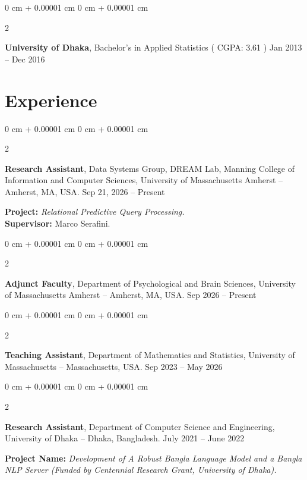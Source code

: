 \documentclass[10pt, letterpaper]{article}
\newenvironment{highlights}{
    \begin{itemize}[
        topsep=0.10 cm,
        parsep=0.10 cm,
        partopsep=0pt,
        itemsep=0pt,
        leftmargin=0 cm + 10pt
    ]
}{
    \end{itemize}
} %
\newenvironment{onecolentry}{
    \begin{adjustwidth}{
        0 cm + 0.00001 cm
    }{
        0 cm + 0.00001 cm
    }
}{
    \end{adjustwidth}
} %
\newenvironment{twocolentry}[2][]{
    \onecolentry
    \def\secondColumn{#2}
    \setcolumnwidth{\fill, 4.5 cm}
    \begin{paracol}{2}
}{
    \switchcolumn \raggedleft \secondColumn
    \end{paracol}
    \endonecolentry
} %
\begin{document}
            \vspace{0.20 cm}
    \begin{twocolentry}{
            Jan 2013 – Dec 2016
        }
            \textbf{University of Dhaka}, Bachelor's in Applied Statistics ( CGPA: 3.61 )\end{twocolentry}
        \vspace{0.10 cm}
    
    \section{Experience}

    \begin{twocolentry}{
            Sep 21, 2026 -- Present
        }
            \textbf{Research Assistant}, Data Systems Group, DREAM Lab, Manning College of Information and Computer Sciences, University of Massachusetts Amherst -- Amherst, MA, USA.\end{twocolentry}

    \textbf{Project: }\textit{Relational Predictive Query Processing.}\\
    \textbf{Supervisor: }Marco Serafini.\\

    
    \begin{twocolentry}{
            Sep 2026 -- Present
        }
            \textbf{Adjunct Faculty}, Department of Psychological and Brain Sciences, University of Massachusetts Amherst -- Amherst, MA, USA.\end{twocolentry}


    \begin{twocolentry}{
            Sep 2023 – May 2026
        }
            \textbf{Teaching Assistant}, Department of Mathematics and Statistics, University of Massachusetts -- Massachusetts, USA.\end{twocolentry}
   \begin{twocolentry}{
            July 2021 -- June 2022
        }
            \textbf{Research Assistant}, Department of Computer Science and Engineering, University of Dhaka -- Dhaka, Bangladesh.\end{twocolentry} 

    \textbf{Project Name:}
    \textit{Development of A Robust Bangla Language Model and a Bangla NLP Server (Funded by Centennial Research Grant, University of Dhaka).}\\
\end{document}
